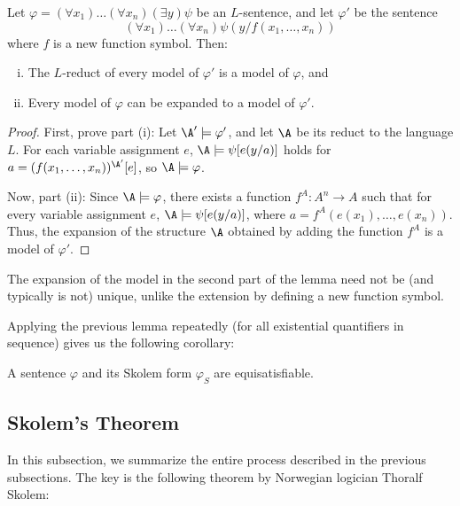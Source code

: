 \begin{lemma}\label{lemma:skolem-variant-conservative-extension}
Let $\varphi=(\forall x_1)\dots(\forall x_n)(\exists y)\psi$ be an $L$-sentence, and let $\varphi'$ be the sentence 
$$
(\forall x_1)\dots(\forall x_n)\psi(y/f(x_1,\dots,x_n))$$
where $f$ is a new function symbol. Then:
\begin{enumerate}[(i)]
    \item The $L$-reduct of every model of $\varphi'$ is a model of $\varphi$, and 
    \item Every model of $\varphi$ can be expanded to a model of $\varphi'$.
\end{enumerate}
\end{lemma}

\begin{proof}
    First, prove part (i): Let $\A'\models\varphi'$, and let $\A$ be its reduct to the language $L$. For each variable assignment $e$, $\A\models\psi[e(y/a)]$ holds for $a=(f(x_1,\dots,x_n))^{\A'}[e]$, so $\A\models\varphi$.
    
    Now, part (ii): Since $\A\models\varphi$, there exists a function $f^A:A^n\to A$ such that for every variable assignment $e$, $\A\models \psi[e(y/a)]$, where $a=f^A(e(x_1),\dots,e(x_n))$. Thus, the expansion of the structure $\A$ obtained by adding the function $f^A$ is a model of $\varphi'$.    
\end{proof}

\begin{remark}
    The expansion of the model in the second part of the lemma need not be (and typically is not) unique, unlike the extension by defining a new function symbol.
\end{remark}

Applying the previous lemma repeatedly (for all existential quantifiers in sequence) gives us the following corollary:

\begin{corollary}
    A sentence $\varphi$ and its Skolem form $\varphi_S$ are equisatisfiable.
\end{corollary}

\subsection{Skolem's Theorem}

In this subsection, we summarize the entire process described in the previous subsections. The key is the following theorem by Norwegian logician Thoralf Skolem:

